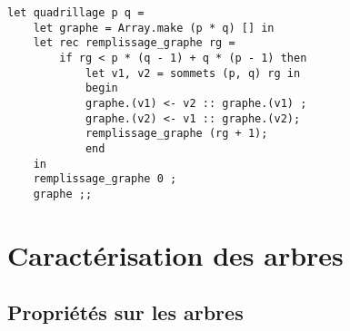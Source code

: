 \documentclass{article}
\begin{document}
\begin{question}
    \item \begin{verbatim}
let quadrillage p q =
    let graphe = Array.make (p * q) [] in
    let rec remplissage_graphe rg =
        if rg < p * (q - 1) + q * (p - 1) then
            let v1, v2 = sommets (p, q) rg in
            begin
            graphe.(v1) <- v2 :: graphe.(v1) ;
            graphe.(v2) <- v1 :: graphe.(v2);
            remplissage_graphe (rg + 1);
            end
    in
    remplissage_graphe 0 ;
    graphe ;; 
    \end{verbatim}
\end{question}

\section{Caractérisation des arbres}

\subsection{Propriétés sur les arbres}
\end{document}
